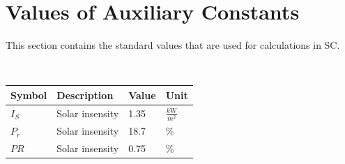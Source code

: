 \documentclass[12pt]{article}
\begin{document}



\section{Values of Auxiliary Constants}\label{sec_VAC}



This section contains the standard values that are used for calculations in SC.


~\newline

\renewcommand{\arraystretch}{1.2}

  \noindent \begin{tabular}{l l l l} 
    \toprule		
    \textbf{Symbol} & \textbf{Description} & \textbf{Value}& \textbf{Unit}\\
    \midrule 
    $I_{S}$ & Solar insensity &1.35 & $\frac{k\si\watt}{m^2}$ \\
 	 $P_r$ & Solar insensity &18.7 & $\%$ \\
	 $PR$ & Solar insensity &0.75 & $\%$ \\
    \bottomrule
  \end{tabular}
\end{document}

